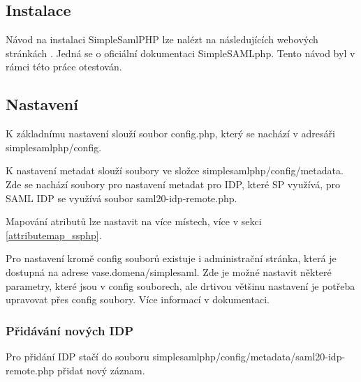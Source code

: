 \subsection{Instalace}
Návod na instalaci SimpleSamlPHP lze nalézt na následujících webových stránkách \cite{SimpleSAMLphp-instalation-and-configurationduid}. Jedná se o oficiální dokumentaci SimpleSAMLphp. Tento návod byl v rámci této práce otestován.

\subsection{Nastavení} %
K základnímu nastavení slouží soubor config.php, který se nachází v adresáři simplesamlphp/config.

K nastavení metadat slouží soubory ve složce simplesamlphp/config/metadata. Zde se nachází soubory pro nastavení metadat pro IDP, které SP využívá, pro SAML IDP se využívá soubor saml20-idp-remote.php.

Mapování atributů lze nastavit na více místech, více v sekci \ref{attributemap_ssphp}.

Pro nastavení kromě config souborů existuje i administrační stránka, která je dostupná na adrese vase.domena/simplesaml. Zde je možné nastavit některé parametry, které jsou v config souborech, ale drtivou většinu nastavení je potřeba upravovat přes config soubory.
Více informací v dokumentaci. \cite{simplesamlphpdoc}

\subsubsection{Přidávání nových IDP} %

Pro přidání IDP stačí do souboru simplesamlphp/config/metadata/saml20-idp-remote.php přidat nový záznam.

